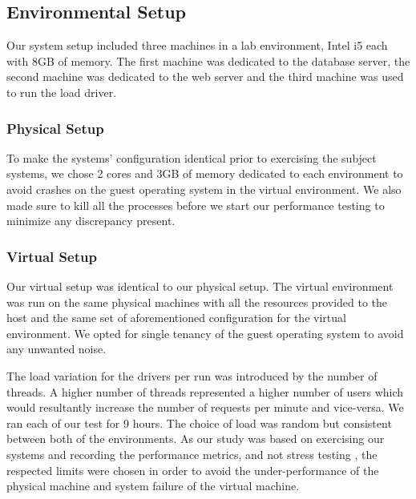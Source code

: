 \subsection{Environmental Setup}
Our system setup included three machines in a lab environment, Intel i5 each with 8GB of memory. The first machine was dedicated to the database server, the second machine was dedicated to the web server and the third machine was used to run the load driver.
\subsubsection{Physical Setup}
To make the systems' configuration identical prior to exercising the subject systems, we chose 2 cores and 3GB of memory dedicated to each environment to avoid crashes on the guest operating system in the virtual environment. We also made sure to kill all the processes before we start our performance testing to minimize any discrepancy present.
\subsubsection{Virtual Setup}
Our virtual setup was identical to our physical setup. The virtual environment was run on the same physical machines with all the resources provided to the host and the same set of aforementioned configuration for the virtual environment. We opted for single tenancy of the guest operating system to avoid any unwanted noise. 


The load variation for the drivers per run was introduced by the number of threads. A higher number of threads represented a higher number of users which would resultantly increase the number of requests per minute and vice-versa. We ran each of our test for 9 hours. The choice of load was random but consistent between both of the environments. As our study was based on exercising our systems and recording the performance metrics, and not stress testing \cite{stresstesting}, the respected limits were chosen in order to avoid the under-performance of the physical machine and system failure of the virtual machine.



